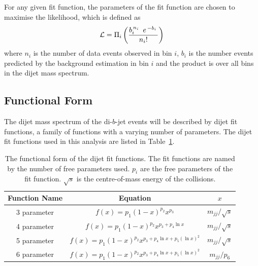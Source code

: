 For any given fit function, the parameters of the fit function are chosen to maximise the likelihood,
which is defined as
\begin{equation}
  \large {\ensuremath{\mathcal{L}}=  \Pi_i \left(  \frac{b_i^{\,n_i\,}~e^{\,-b_i\,}}{n_i!} \right)}
  \label{eqn:bkg-like}
\end{equation}
where $n_i$ is the number of data events observed in bin $i$,
$b_i$ is the number events predicted by the background estimation in bin $i$
and the product is over all bins in the dijet mass spectrum.

\subsection{Functional Form}
\label{sec:bkg-func}



The dijet mass spectrum of the di-$b$-jet events will be described by dijet fit functions,
a family of functions with a varying number of parameters.
The dijet fit functions used in this analysis are listed in Table~\ref{tab:bkg-fit}.

{\renewcommand{\arraystretch}{1.2}
\begin{table}[!thb]
\centering
\begin{tabular}{|c||c|c|}
  \hline
  Function Name & Equation                                          & $x$ \\
  \hline
  3 parameter   & $f(x)=p_1(1-x)^{p_2}x^{p_3}$                        & $m_{jj}/\sqrt{s}$ \\
  4 parameter   & $f(x)=p_1(1-x)^{p_2}x^{p_3+p_4\ln{x}}$               & $m_{jj}/\sqrt{s}$\\
  5 parameter   & $f(x)=p_1(1-x)^{p_2}x^{p_3+p_4\ln{x}+p_5(\ln{x})^{2}}$  & $m_{jj}/\sqrt{s}$\\ 
  6 parameter   & $f(x)=p_1(1-x)^{p_2}x^{p_3+p_4\ln{x}+p_5(\ln{x})^{2}}$  &  $m_{jj}/p_6$\\ 
  \hline
\end{tabular}
\caption{The functional form of the dijet fit functions.
  The fit functions are named by the number of free parameters used. $p_{i}$ are the free parameters of the fit function.
  $\sqrt{s}$ is the centre-of-mass energy of the collisions.}
\label{tab:bkg-fit}
\end{table}}

